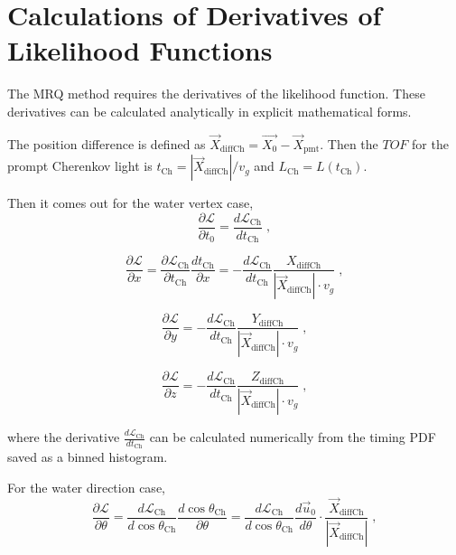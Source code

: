 \section{Calculations of Derivatives of Likelihood Functions}\label{appendix:likelihoodCalcu}
The MRQ method requires the derivatives of the likelihood function. These derivatives can be calculated analytically in explicit mathematical forms.

The position difference is defined as $\vec{X}_{{\mathrm{diffCh}}} = \vec{X_0}-\vec{X}_{\mathrm{pmt}}$. Then the $TOF$ for the prompt Cherenkov light is $t_{\mathrm{Ch}}=|\vec{X}_{{\mathrm{diffCh}}}|/v_g$ and $L_{\mathrm{Ch}}=L(t_{\mathrm{Ch}})$.

Then it comes out for the water vertex case,
\begin{equation}
\frac{\partial \mathcal{L}}{\partial t_0}=\frac{d\mathcal{L}_{\mathrm{Ch}}}{dt_{\mathrm{Ch}}} \;,
\end{equation}

\begin{equation}
\frac{\partial \mathcal{L}}{\partial x}=\frac{\partial \mathcal{L}_{\mathrm{Ch}}}{\partial t_{\mathrm{Ch}}}\frac{dt_{\mathrm{Ch}}}{\partial x}=-\frac{d\mathcal{L}_{\mathrm{Ch}}}{dt_{\mathrm{Ch}}}\frac{X_{{\mathrm{diffCh}}}}{|\vec{X}_{{\mathrm{diffCh}}}|\cdot v_g} \;,
\end{equation}

\begin{equation}
\frac{\partial \mathcal{L}}{\partial y}=-\frac{d\mathcal{L}_{\mathrm{Ch}}}{dt_{\mathrm{Ch}}}\frac{Y_{{\mathrm{diffCh}}}}{|\vec{X}_{{\mathrm{diffCh}}}|\cdot v_g}\; ,
\end{equation}

\begin{equation}
\frac{\partial \mathcal{L}}{\partial z}=-\frac{d\mathcal{L}_{\mathrm{Ch}}}{dt_{\mathrm{Ch}}}\frac{Z_{{\mathrm{diffCh}}}}{|\vec{X}_{{\mathrm{diffCh}}}|\cdot v_g}\; ,
\end{equation}

where the derivative $\frac{d\mathcal{L}_{\mathrm{Ch}}}{dt_{\mathrm{Ch}}}$ can be calculated numerically from the timing PDF saved as a binned histogram.

For the water direction case,
\begin{equation}
\frac{\partial \mathcal{L}}{\partial\theta}=\frac{d\mathcal{L}_{\mathrm{Ch}}}{d\cos\theta_{\mathrm{Ch}}}\frac{d\cos\theta_{\mathrm{Ch}}}{\partial\theta}
=\frac{d\mathcal{L}_{\mathrm{Ch}}}{d\cos\theta_{\mathrm{Ch}}}\frac{d\vec{u}_0}{d\theta}\cdot\frac{\vec{X}_{{\mathrm{diffCh}}}}{|\vec{X}_{{\mathrm{diffCh}}}|}\; ,
\end{equation}

